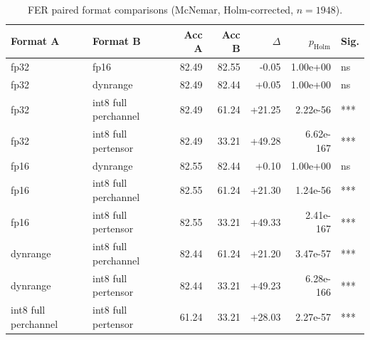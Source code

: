 \begin{table}[htbp]\centering
\caption{FER paired format comparisons (McNemar, Holm-corrected, $n=1948$).}
\begin{tabular}{llrrrrl}
\hline
Format A & Format B & Acc A & Acc B & $\Delta$ & $p_{\mathrm{Holm}}$ & Sig. \\
\hline
fp32 & fp16 & 82.49 & 82.55 & -0.05 & 1.00e+00 & ns \\
fp32 & dynrange & 82.49 & 82.44 & +0.05 & 1.00e+00 & ns \\
fp32 & int8 full perchannel & 82.49 & 61.24 & +21.25 & 2.22e-56 & *** \\
fp32 & int8 full pertensor & 82.49 & 33.21 & +49.28 & 6.62e-167 & *** \\
fp16 & dynrange & 82.55 & 82.44 & +0.10 & 1.00e+00 & ns \\
fp16 & int8 full perchannel & 82.55 & 61.24 & +21.30 & 1.24e-56 & *** \\
fp16 & int8 full pertensor & 82.55 & 33.21 & +49.33 & 2.41e-167 & *** \\
dynrange & int8 full perchannel & 82.44 & 61.24 & +21.20 & 3.47e-57 & *** \\
dynrange & int8 full pertensor & 82.44 & 33.21 & +49.23 & 6.28e-166 & *** \\
int8 full perchannel & int8 full pertensor & 61.24 & 33.21 & +28.03 & 2.27e-57 & *** \\
\hline
\end{tabular}
\end{table}
